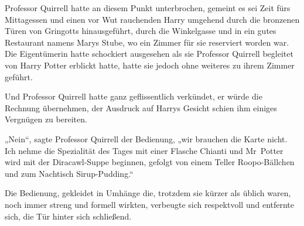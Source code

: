 Professor Quirrell hatte an diesem Punkt unterbrochen, gemeint es sei Zeit fürs Mittagessen und einen vor Wut rauchenden Harry umgehend durch die bronzenen Türen von Gringotts hinausgeführt, durch die Winkelgasse und in ein gutes Restaurant namens Marys Stube, wo ein Zimmer für sie reserviert worden war. Die Eigentümerin hatte schockiert ausgesehen als sie Professor Quirrell begleitet von Harry Potter erblickt hatte, hatte sie jedoch ohne weiteres zu ihrem Zimmer geführt.

Und Professor Quirrell hatte ganz geflissentlich verkündet, er würde die Rechnung übernehmen, der Ausdruck auf Harrys Gesicht schien ihm einiges Vergnügen zu bereiten.

„Nein“, sagte Professor Quirrell der Bedienung, „wir brauchen die Karte nicht. Ich nehme die Spezialität des Tages mit einer Flasche Chianti und Mr~Potter wird mit der Diracawl-Suppe beginnen, gefolgt von einem Teller Roopo-Bällchen und zum Nachtisch Sirup-Pudding.“%

Die Bedienung, gekleidet in Umhänge die, trotzdem sie kürzer als üblich waren, noch immer streng und formell wirkten, verbeugte sich respektvoll und entfernte sich, die Tür hinter sich schließend.

